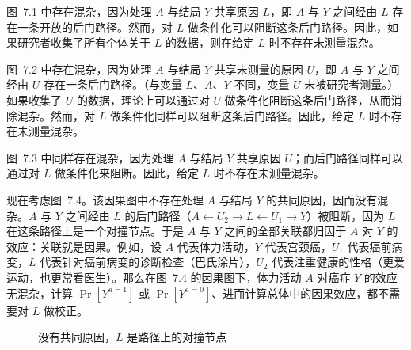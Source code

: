 图~7.1 中存在混杂，因为处理 $A$ 与结局 $Y$ 共享原因 $L$，即 $A$ 与 $Y$ 之间经由 $L$ 存在一条开放的后门路径。然而，对 $L$ 做条件化可以阻断这条后门路径。因此，如果研究者收集了所有个体关于 $L$ 的数据，则在给定 $L$ 时不存在未测量混杂。

图~7.2 中存在混杂，因为处理 $A$ 与结局 $Y$ 共享未测量的原因 $U$，即 $A$ 与 $Y$ 之间经由 $U$ 存在一条后门路径。（与变量 $L$、$A$、$Y$ 不同，变量 $U$ 未被研究者测量。）如果收集了 $U$ 的数据，理论上可以通过对 $U$ 做条件化阻断这条后门路径，从而消除混杂。然而，对 $L$ 做条件化同样可以阻断这条后门路径。因此，给定 $L$ 时不存在未测量混杂。

图~7.3 中同样存在混杂，因为处理 $A$ 与结局 $Y$ 共享原因 $U$；而后门路径同样可以通过对 $L$ 做条件化来阻断。因此，给定 $L$ 时不存在未测量混杂。

现在考虑图~7.4。该因果图中不存在处理 $A$ 与结局 $Y$ 的共同原因，因而没有混杂。$A$ 与 $Y$ 之间经由 $L$ 的后门路径（$A\leftarrow U_2\to L\leftarrow U_1\to Y$）被阻断，因为 $L$ 在这条路径上是一个对撞节点。于是 $A$ 与 $Y$ 之间的全部关联都归因于 $A$ 对 $Y$ 的效应：关联就是因果。例如，设 $A$ 代表体力活动，$Y$ 代表宫颈癌，$U_1$ 代表癌前病变，$L$ 代表针对癌前病变的诊断检查（巴氏涂片），$U_2$ 代表注重健康的性格（更爱运动，也更常看医生）。那么在图~7.4 的因果图下，体力活动 $A$ 对癌症 $Y$ 的效应无混杂，计算 $\Pr[Y^{a=1}]$ 或 $\Pr[Y^{a=0}]$、进而计算总体中的因果效应，都不需要对 $L$ 做校正。

\begin{figure}[htbp]
\centering
{}
\caption{没有共同原因，$L$ 是路径上的对撞节点}
\label{fig:7.4}
\end{figure}

